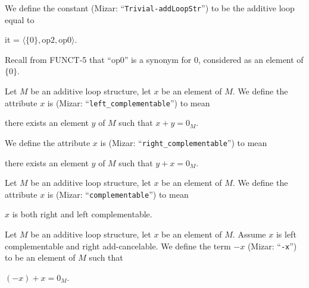 \documentclass{article}
\begin{document}
\begin{definition}%
We define the constant 
(Mizar: ``\verb#Trivial-addLoopStr#'') to be the additive loop equal to
\begin{defn}%
\item it = $\langle\{0\},\mbox{op2},\mbox{op0}\rangle$.
\end{defn}
\end{definition}

\begin{remark}
Recall from FUNCT-5 that ``op0'' is a synonym for 0, considered as an
element of $\{0\}$.
\end{remark}

\begin{definition}
Let $M$ be an additive loop structure, let $x$ be an element of $M$.
We define the attribute $x$ is 
(Mizar: ``\verb#left_complementable#'') to mean
\begin{defn}
\item there exists an element $y$ of $M$ such that $x+y=0_{M}$.
\end{defn}
We define the attribute $x$ is 
(Mizar: ``\verb#right_complementable#'') to mean
\begin{defn}
\item there exists an element $y$ of $M$ such that $y+x=0_{M}$.
\end{defn}
\end{definition}

\begin{definition}
Let $M$ be an additive loop structure, let $x$ be an element of $M$.
We define the attribute $x$ is  (Mizar: ``\verb#complementable#'')
to mean
\begin{defn}
\item $x$ is both right and left complementable.
\end{defn}
\end{definition}

\begin{definition}
Let $M$ be an additive loop structure, let $x$ be an element of $M$.
Assume $x$ is left complementable and right add-cancelable.
We define the term $-x$ (Mizar: ``\verb#-x#'') to be an element of $M$
such that
\begin{defn}
\item $(-x) + x=0_{M}$.
\end{defn}
\end{definition}
\end{document}
